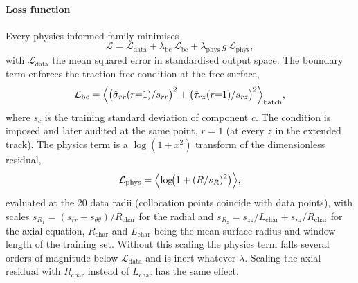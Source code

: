 \documentclass[subscriptcorrection,upint,varvw,barcolor=Goldenrod3,mathalfa=cal=euler,balance,hyphenate,french,pdf-a]{asmejour} %
\begin{document}
\paragraph{Loss function}
Every physics-informed family minimises
\begin{equation}
  \mathcal{L} = \mathcal{L}_{\mathrm{data}}
              + \lambda_{\mathrm{bc}}\,\mathcal{L}_{\mathrm{bc}}
              + \lambda_{\mathrm{phys}}\,g\,\mathcal{L}_{\mathrm{phys}},
  \label{eq:loss}
\end{equation}
with $\mathcal{L}_{\mathrm{data}}$ the mean squared error in standardised output
space. The boundary term enforces the traction-free condition at the free
surface,
\begin{equation}
  \mathcal{L}_{\mathrm{bc}} = \Bigl\langle
     \bigl(\hat\sigma_{rr}(r{=}1)/s_{rr}\bigr)^2
   + \bigl(\hat\tau_{rz}(r{=}1)/s_{rz}\bigr)^2 \Bigr\rangle_{\mathrm{batch}},
  \label{eq:lbc}
\end{equation}
where $s_c$ is the training standard deviation of component $c$. The condition is
imposed and later audited at the same point, $r=1$ (at every $z$ in the extended
track). The physics term is a $\log(1+x^2)$ transform of the dimensionless
residual,
\begin{equation}
  \mathcal{L}_{\mathrm{phys}} = \Bigl\langle \log\!\bigl(1 + (R/s_R)^2\bigr) \Bigr\rangle,
  \label{eq:lphys}
\end{equation}
evaluated at the 20 data radii (collocation points coincide with data points),
with scales $s_{R_1}=(s_{rr}+s_{\theta\theta})/R_{\mathrm{char}}$ for the radial and
$s_{R_z}=s_{zz}/L_{\mathrm{char}}+s_{rz}/R_{\mathrm{char}}$ for the axial equation,
$R_{\mathrm{char}}$ and $L_{\mathrm{char}}$ being the mean surface radius and window
length of the training set.
Without this scaling the physics term falls several orders of magnitude below
$\mathcal{L}_{\mathrm{data}}$ and is inert whatever $\lambda$. Scaling the axial
residual with $R_{\mathrm{char}}$ instead of $L_{\mathrm{char}}$ has the same effect.
\end{document}
